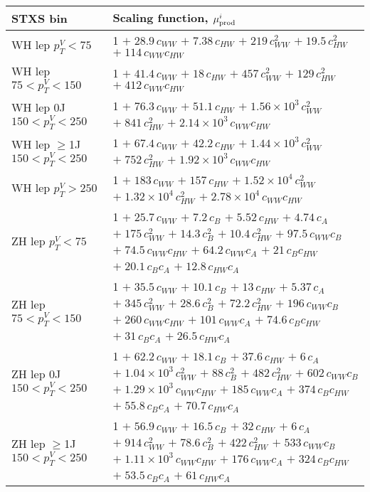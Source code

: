 \begin{tabular}{l|p{}}
    STXS bin & Scaling function, $\mu^i_{\rm{prod}}$ \\ \hline
    WH lep $p_{T}^{V} < 75$ & 1 $+\;28.9\,c_{WW}$ $+\;7.38\,c_{HW}$ $+\;219\,c_{WW}^{2}$ $+\;19.5\,c_{HW}^{2}$ $+\;114\,c_{WW}c_{HW}$ \\
    WH lep $75 < p_{T}^{V} < 150$ & 1 $+\;41.4\,c_{WW}$ $+\;18\,c_{HW}$ $+\;457\,c_{WW}^{2}$ $+\;129\,c_{HW}^{2}$ $+\;412\,c_{WW}c_{HW}$ \\
    WH lep 0J $150 < p_{T}^{V} < 250$ & 1 $+\;76.3\,c_{WW}$ $+\;51.1\,c_{HW}$ $+\;1.56\times 10^{3}\,c_{WW}^{2}$ $+\;841\,c_{HW}^{2}$ $+\;2.14\times 10^{3}\,c_{WW}c_{HW}$ \\
    WH lep $\geq$1J $150 < p_{T}^{V} < 250$ & 1 $+\;67.4\,c_{WW}$ $+\;42.2\,c_{HW}$ $+\;1.44\times 10^{3}\,c_{WW}^{2}$ $+\;752\,c_{HW}^{2}$ $+\;1.92\times 10^{3}\,c_{WW}c_{HW}$ \\
    WH lep $p_{T}^{V} > 250$ & 1 $+\;183\,c_{WW}$ $+\;157\,c_{HW}$ $+\;1.52\times 10^{4}\,c_{WW}^{2}$ $+\;1.32\times 10^{4}\,c_{HW}^{2}$ $+\;2.78\times 10^{4}\,c_{WW}c_{HW}$ \\
    \hline
    ZH lep $p_{T}^{V} < 75$ & 1 $+\;25.7\,c_{WW}$ $+\;7.2\,c_{B}$ $+\;5.52\,c_{HW}$ $+\;4.74\,c_{A}$ $+\;175\,c_{WW}^{2}$ $+\;14.3\,c_{B}^{2}$ $+\;10.4\,c_{HW}^{2}$ $+\;97.5\,c_{WW}c_{B}$ $+\;74.5\,c_{WW}c_{HW}$ $+\;64.2\,c_{WW}c_{A}$ $+\;21\,c_{B}c_{HW}$ $+\;20.1\,c_{B}c_{A}$ $+\;12.8\,c_{HW}c_{A}$ \\
    ZH lep $75 < p_{T}^{V} < 150$ & 1 $+\;35.5\,c_{WW}$ $+\;10.1\,c_{B}$ $+\;13\,c_{HW}$ $+\;5.37\,c_{A}$ $+\;345\,c_{WW}^{2}$ $+\;28.6\,c_{B}^{2}$ $+\;72.2\,c_{HW}^{2}$ $+\;196\,c_{WW}c_{B}$ $+\;260\,c_{WW}c_{HW}$ $+\;101\,c_{WW}c_{A}$ $+\;74.6\,c_{B}c_{HW}$ $+\;31\,c_{B}c_{A}$ $+\;26.5\,c_{HW}c_{A}$ \\
    ZH lep 0J $150 < p_{T}^{V} < 250$ & 1 $+\;62.2\,c_{WW}$ $+\;18.1\,c_{B}$ $+\;37.6\,c_{HW}$ $+\;6\,c_{A}$ $+\;1.04\times 10^{3}\,c_{WW}^{2}$ $+\;88\,c_{B}^{2}$ $+\;482\,c_{HW}^{2}$ $+\;602\,c_{WW}c_{B}$ $+\;1.29\times 10^{3}\,c_{WW}c_{HW}$ $+\;185\,c_{WW}c_{A}$ $+\;374\,c_{B}c_{HW}$ $+\;55.8\,c_{B}c_{A}$ $+\;70.7\,c_{HW}c_{A}$ \\
    ZH lep $\geq$1J $150 < p_{T}^{V} < 250$ & 1 $+\;56.9\,c_{WW}$ $+\;16.5\,c_{B}$ $+\;32\,c_{HW}$ $+\;6\,c_{A}$ $+\;914\,c_{WW}^{2}$ $+\;78.6\,c_{B}^{2}$ $+\;422\,c_{HW}^{2}$ $+\;533\,c_{WW}c_{B}$ $+\;1.11\times 10^{3}\,c_{WW}c_{HW}$ $+\;176\,c_{WW}c_{A}$ $+\;324\,c_{B}c_{HW}$ $+\;53.5\,c_{B}c_{A}$ $+\;61\,c_{HW}c_{A}$ \\

\end{tabular}
